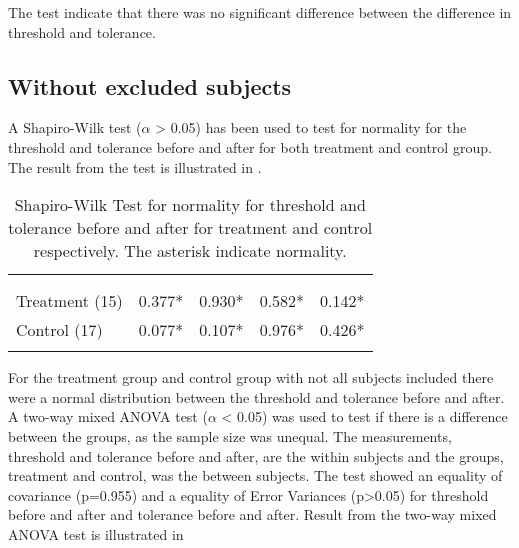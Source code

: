 The test indicate that there was no significant difference between the difference in threshold and tolerance.

\subsection{Without excluded subjects}
A Shapiro-Wilk test ($\alpha$ > 0.05) has been used to test for normality for the threshold and tolerance before and after for both treatment and control group. The result from the test is illustrated in .

\begin{longtable} {l|c|c|c|c}
\rowcolor[HTML]{C0C0C0} 
  \color[HTML]{000000}{} & 
 \multicolumn{2}{c|}{ \color[HTML]{000000}{\textbf{Threshold}}} & \multicolumn{2}{c}{ \color[HTML]{000000}{\textbf{Tolerance}}}  	\\  \rule{0pt}{3ex} 
  \cellcolor[HTML]{C0C0C0}{} &
 \multicolumn{1}{c|}{ \cellcolor[HTML]{C0C0C0}{Pre }} & \multicolumn{1}{c|}{ \cellcolor[HTML]{C0C0C0}{Post}} 
 & \multicolumn{1}{|c|}{ \cellcolor[HTML]{C0C0C0}{Pre}} 
 & \multicolumn{1}{c}{ \cellcolor[HTML]{C0C0C0}{Post}} 	\\ \hline 
Treatment (15) & 0.377*  & 0.930* & 0.582* & 0.142* \\ \hline
Control (17)& 0.077* & 0.107* & 0.976* & 0.426* \\ \hline
	\caption{Shapiro-Wilk Test for normality for threshold and tolerance before and after for treatment and control respectively. The asterisk indicate normality.}
	\label{tab:ShapiroWilk1}
\end{longtable}
\vspace{-.5cm}

For the treatment group and control group with not all subjects included there were a normal distribution between the threshold and tolerance before and after.   A two-way mixed ANOVA test ($\alpha$ < 0.05) was used to test  if there is a difference between the groups, as the sample size was unequal. The measurements, threshold and tolerance before and after, are the within subjects and the groups, treatment and control, was the between subjects. The test showed an equality of covariance (p=0.955) and a equality of Error Variances (p>0.05) for threshold before and after and tolerance before and after. Result from the two-way mixed ANOVA test is illustrated in 

